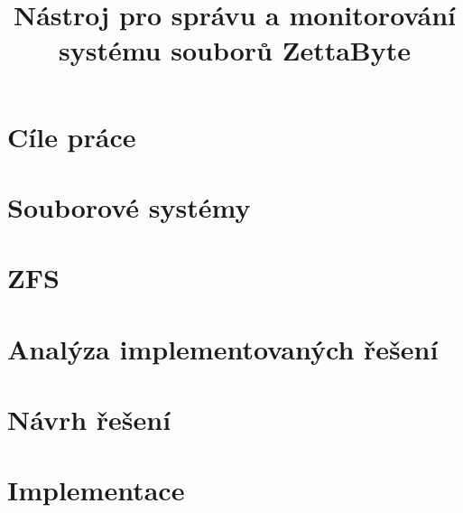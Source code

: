 \documentclass[thesis=B,czech,hidelinks]{FITthesis}[2012/06/26]
\title{Nástroj pro správu a monitorování systému souborů ZettaByte}
\begin{document}

\begin{introduction}
    
\end{introduction}

\chapter{Cíle práce}
    

\chapter{Souborové systémy}
    

\chapter{ZFS}
    

\chapter{Analýza implementovaných řešení}
    

\chapter{Návrh řešení}
    
\chapter{Implementace}
    
\begin{conclusion}
	
\end{conclusion}




\appendix
\end{document}
